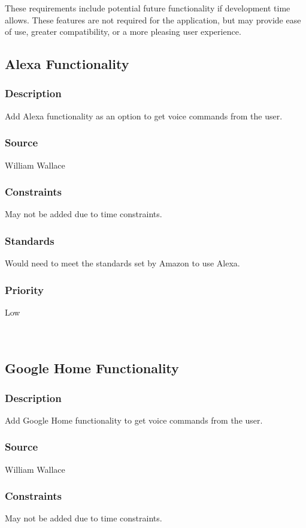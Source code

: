 These requirements include potential future functionality if development time allows. These features are not required for the application, but may provide ease of use, greater compatibility, or a more pleasing user experience.

\subsection{Alexa Functionality}
\subsubsection{Description}
Add Alexa functionality as an option to get voice commands from the user.
\subsubsection{Source}
William Wallace
\subsubsection{Constraints}
May not be added due to time constraints.
\subsubsection{Standards}
Would need to meet the standards set by Amazon to use Alexa.
\subsubsection{Priority}
Low\\
\\
\\
\subsection{Google Home Functionality}
\subsubsection{Description}
Add Google Home functionality to get voice commands from the user. 
\subsubsection{Source}
William Wallace
\subsubsection{Constraints}
May not be added due to time constraints.
